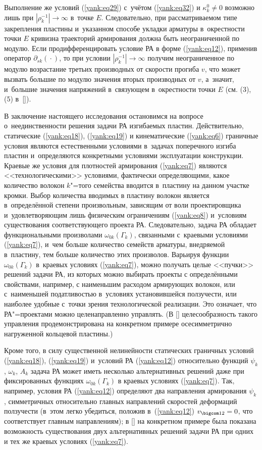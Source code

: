 Выполнение же условий (\ref{yank:eq29}) с~учётом (\ref{yank:eq32}) и $\kappa_k ^0 \ne 0 $ возможно лишь при $|\rho_k ^{-1}|\to \infty$ в~точке $E$. 
Следовательно, при рассматриваемом типе закрепления пластины и~указанном способе укладки арматуры в~окрестности точки $E$ кривизна траекторий армирования должна быть неограниченной по модулю.
Если продифференцировать условие РА в форме (\ref{yank:eq12}), применив оператор $\partial_{sk}({} \cdot {})$, то при условии
$|\rho_k ^{-1}|\to \infty$ получим неограниченное по модулю возрастание третьих производных от скорости прогиба $v$, что может
вызвать большие по модулю значения вторых производных от $v$, а~значит, и~большие значения напряжений в~связующем в~окрестности точки $E$ (см. (3), (5) в~[]).

В заключение настоящего исследования остановимся на вопросе о~неединственности решения задачи РА изгибаемых пластин. Действительно, статические (\ref{yank:eq18}), (\ref{yank:eq19}) и кинематические (\ref{yank:eq6}) граничные условия являются естественными условиями в~задачах поперечного изгиба пластин и~определяются конкретными условиями эксплуатации конструкции. Краевые же условия для плотностей армирования (\ref{yank:eq7}) являются <<технологическими>> условиями, фактически определяющими, какое количество волокон $k$"=того семейства вводится в~пластину на данном участке кромки. 
Выбор количества вводимых в пластину волокон является в~определённой степени произвольным, зависящим от воли проектировщика и~удовлетворяющим лишь физическим ограничениям (\ref{yank:eq8}) и~условиям существования соответствующего проекта РА. Следовательно, задача РА обладает функциональными произволами $\omega_{0k}(\Gamma_k )$, связанными с~краевыми условиями (\ref{yank:eq7}), и~чем больше количество семейств арматуры, внедряемой в~пластину, тем больше количество этих произволов. Варьируя функции $\omega_{0k}(\Gamma_k )$ в~краевых условиях (\ref{yank:eq7}), можно получать целые <<пучки>> решений задачи РА, из которых можно выбирать проекты с определёнными свойствами, например, с наименьшим расходом армирующих волокон, или с~наименьшей податливостью в~условиях установившейся ползучести, или наиболее удобные с~точки зрения технологической реализации. 
Это означает, что РА"=проектами можно целенаправленно управлять. 
(В [] целесообразность такого управления продемонстрирована на конкретном примере осесимметрично нагруженной кольцевой пластины.)

Кроме того, в силу существенной нелинейности статических граничных условий (\ref{yank:eq18}), (\ref{yank:eq19}) и~условий РА (\ref{yank:eq12}) относительно функций $\psi_k $, $\omega_k $, $A_k $ задача РА может иметь несколько альтернативных решений даже при фиксированных функциях $\omega_{0k}(\Gamma_k )$ в краевых условиях (\ref{yank:eq7}). 
Так, например, условия РА (\ref{yank:eq12}) определяют два направления армирования $\psi_k$, симметричных относительно главных направлений скоростей деформаций ползучести (в~этом легко убедиться, положив в~(\ref{yank:eq12}) $v_{\bigcom 12}=0$, что соответствует главным направлениям); в [] на конкретном примере была показана возможность существования двух альтернативных решений задачи РА при одних и тех же краевых условиях (\ref{yank:eq7}).

